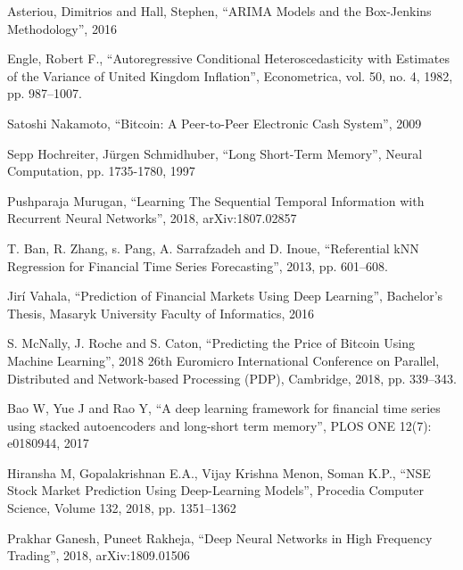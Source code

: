 \documentclass[conference]{IEEEtran}
\begin{document}
\begin{thebibliography}{00}

 Asteriou, Dimitrios and Hall, Stephen, ``ARIMA Models and the Box-Jenkins Methodology'', 2016

 Engle, Robert F., ``Autoregressive Conditional Heteroscedasticity with Estimates of the Variance of United Kingdom Inflation'', Econometrica, vol. 50, no. 4, 1982, pp. 987--1007.

 Satoshi Nakamoto, ``Bitcoin: A Peer-to-Peer Electronic Cash System'', 2009

 Sepp Hochreiter, Jürgen Schmidhuber, ``Long Short-Term Memory'', Neural Computation, pp. 1735-1780, 1997

 Pushparaja Murugan, ``Learning The Sequential Temporal Information with Recurrent Neural Networks'', 2018, arXiv:1807.02857

 T. Ban, R. Zhang, s. Pang, A. Sarrafzadeh and D. Inoue, ``Referential kNN Regression for Financial Time Series Forecasting'', 2013, pp. 601--608.

 Jirí Vahala, ``Prediction of Financial Markets Using Deep Learning'', Bachelor's Thesis, Masaryk University Faculty of Informatics, 2016

 S. McNally, J. Roche and S. Caton, ``Predicting the Price of Bitcoin Using Machine Learning'', 2018 26th Euromicro International Conference on Parallel, Distributed and Network-based Processing (PDP), Cambridge, 2018, pp. 339--343.

 Bao W, Yue J and Rao Y, ``A deep learning framework for financial time series using stacked autoencoders and long-short term memory'', PLOS ONE 12(7): e0180944, 2017

 Hiransha M, Gopalakrishnan E.A., Vijay Krishna Menon, Soman K.P., ``NSE Stock Market Prediction Using Deep-Learning Models'', Procedia Computer Science, Volume 132, 2018, pp. 1351--1362

 Prakhar Ganesh, Puneet Rakheja, ``Deep Neural Networks in High Frequency Trading'', 2018, arXiv:1809.01506

\end{thebibliography}
\end{document}

